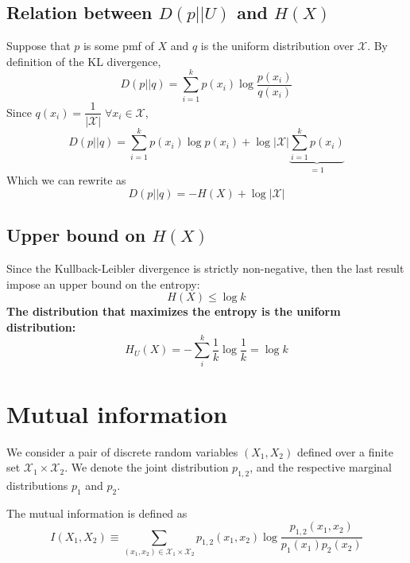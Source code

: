 \documentclass{article}
\numberwithin{equation}{section}
\theoremstyle{casep}
\begin{document}
\subsection{Relation between $D(p || U)$ and $H(X)$}
Suppose that $p$ is some pmf of $X$ and $q$ is the uniform distribution 
over $\mathcal{X}$. By definition of the KL divergence,
\[
        D(p||q) = \sum_{i = 1}^k p(x_i) \log \frac{p(x_i)}{q(x_i)}
\]
Since $q(x_i) = \dfrac{1}{|\mathcal{X}|}\; \forall x_i \in \mathcal{X}$,
\[
        D(p||q) = \sum_{i = 1}^k p(x_i)\log p(x_i) 
        + \log |\mathcal{X}|\underbrace{\sum_{i =1}^k p(x_i)}_{= 1}
\]
Which we can rewrite as
\[
        \boxed{D(p||q) = -H(X) + \log |\mathcal{X}|}
\]

\subsection{Upper bound on $H(X)$}
Since the Kullback-Leibler divergence is strictly non-negative, then the last result 
impose an upper bound on the entropy:
\[
        \boxed{     H(X) \leq \log k}
\]
\textbf{The distribution that maximizes the entropy is the uniform distribution:}
\[
        H_U(X) = -\sum_i^k \frac{1}{k} \log \frac{1}{k} = \log k
\]


\section{Mutual information}
We consider a pair of discrete random variables $(X_1, X_2)$ defined over a finite 
set $\mathcal{X}_1 \times \mathcal{X}_2$. We denote the joint distribution $p_{1,2}$, 
and the respective marginal distributions $p_1$ and $p_2$.

The mutual information is defined as
\begin{equation}\label{eq:MI}
        I(X_1, X_2) \equiv \sum_{(x_1,x_2) \in \mathcal{X}_1 \times \mathcal{X}_2} 
        p_{1,2}(x_1,x_2) \log \frac{p_{1,2}(x_1,x_2)}{p_1(x_1) p_2(x_2)}
\end{equation} 
\end{document}
